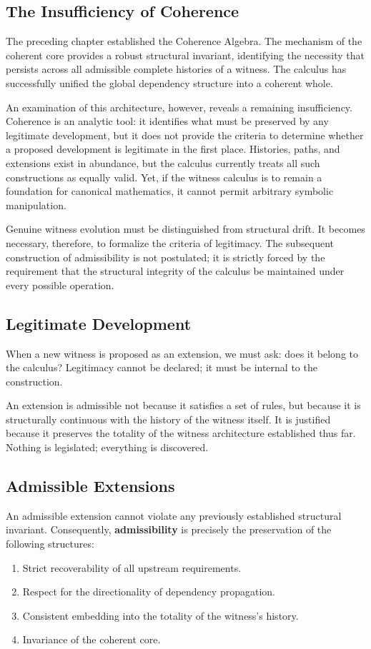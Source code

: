 \documentclass[12pt,anyside]{book}
\begin{document}
\subsection{The Insufficiency of Coherence}
The preceding chapter established the Coherence Algebra. The mechanism of the coherent core provides a robust structural invariant, identifying the necessity that persists across all admissible complete histories of a witness. The calculus has successfully unified the global dependency structure into a coherent whole.

An examination of this architecture, however, reveals a remaining insufficiency. Coherence is an analytic tool: it identifies what must be preserved by any legitimate development, but it does not provide the criteria to determine whether a proposed development is legitimate in the first place. Histories, paths, and extensions exist in abundance, but the calculus currently treats all such constructions as equally valid. Yet, if the witness calculus is to remain a foundation for canonical mathematics, it cannot permit arbitrary symbolic manipulation. 

Genuine witness evolution must be distinguished from structural drift. It becomes necessary, therefore, to formalize the criteria of legitimacy. The subsequent construction of admissibility is not postulated; it is strictly forced by the requirement that the structural integrity of the calculus be maintained under every possible operation.

\subsection{Legitimate Development}
When a new witness is proposed as an extension, we must ask: does it belong to the calculus? Legitimacy cannot be declared; it must be internal to the construction. 

An extension is admissible not because it satisfies a set of rules, but because it is structurally continuous with the history of the witness itself. It is justified because it preserves the totality of the witness architecture established thus far. Nothing is legislated; everything is discovered.

\subsection{Admissible Extensions}
An admissible extension cannot violate any previously established structural invariant. Consequently, \textbf{admissibility} is precisely the preservation of the following structures:
\begin{enumerate}
    \item Strict recoverability of all upstream requirements.
    \item Respect for the directionality of dependency propagation.
    \item Consistent embedding into the totality of the witness's history.
    \item Invariance of the coherent core.
\end{enumerate}
\end{document}
